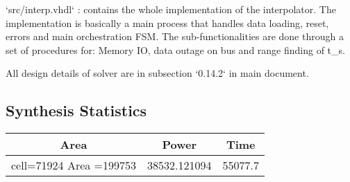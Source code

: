\documentclass[12pt]{report}
\begin{document}
    `src/interp.vhdl` : contains the whole implementation of the interpolator. The implementation is basically a main process that handles data loading, reset, errors and main orchestration FSM. The sub-functionalities are done through a set of procedures for: Memory IO, data outage on bus and range finding of t\_s.

    All design details of solver are in subsection `0.14.2` in main document. 
    \subsection{Synthesis Statistics}
    \begin{tabular}{||c|c|c||}
        \hline
        Area & Power & Time\\\hline\hline
        cell=71924 Area =199753 & 38532.121094 & 55077.7\\\hline
    \end{tabular}
\end{document}
